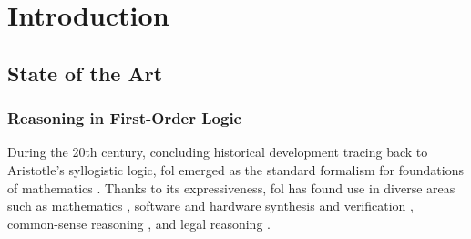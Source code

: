 \newcommand{\defn}\emph


\chapter{Introduction}
\glsresetall


\section{State of the Art}
\label{sec:sota}

\subsection{Reasoning in First-Order Logic}


During the 20th century,
concluding historical development tracing back to Aristotle's syllogistic logic,
\gls{fol} emerged as the standard formalism for foundations of mathematics
\cite{DBLP:journals/bsl/Ferreiros01}.%
Thanks to its expressiveness, \gls{fol} has found use in diverse areas such as
mathematics \cite{},
software and hardware synthesis and verification \cite{},
common-sense reasoning \cite{}, and
legal reasoning \cite{}.

